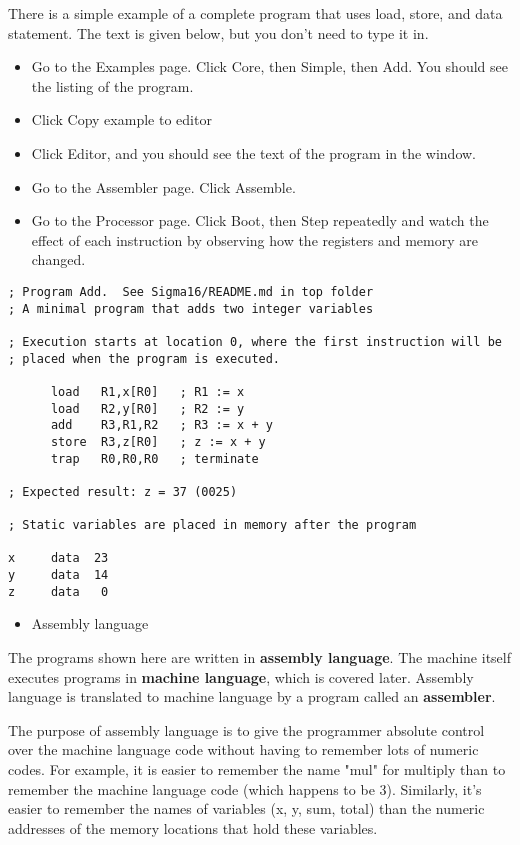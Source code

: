 \documentclass[11pt]{article}
\begin{document}
\begin{itemize}
There is a simple example of a complete program that uses load, store,
and data statement.  The text is given below, but you don't need to
type it in.

\begin{itemize}
\item Go to the Examples page.  Click Core, then Simple, then Add.  You
should see the listing of the program.
\item Click Copy example to editor
\item Click Editor, and you should see the text of the program in the
window.
\item Go to the Assembler page.  Click Assemble.
\item Go to the Processor page.  Click Boot, then Step repeatedly and
watch the effect of each instruction by observing how the registers
and memory are changed.
\end{itemize}

\begin{verbatim}
; Program Add.  See Sigma16/README.md in top folder
; A minimal program that adds two integer variables

; Execution starts at location 0, where the first instruction will be
; placed when the program is executed.

      load   R1,x[R0]   ; R1 := x
      load   R2,y[R0]   ; R2 := y
      add    R3,R1,R2   ; R3 := x + y
      store  R3,z[R0]   ; z := x + y
      trap   R0,R0,R0   ; terminate

; Expected result: z = 37 (0025)

; Static variables are placed in memory after the program

x     data  23
y     data  14
z     data   0
\end{verbatim}

\begin{itemize}
\item Assembly language
\end{itemize}

The programs shown here are written in \textbf{assembly language}.  The
machine itself executes programs in \textbf{machine language}, which is
covered later.  Assembly language is translated to machine language by
a program called an \textbf{assembler}.

The purpose of assembly language is to give the programmer absolute
control over the machine language code without having to remember lots
of numeric codes.  For example, it is easier to remember the name
"mul" for multiply than to remember the machine language code (which
happens to be 3).  Similarly, it's easier to remember the names of
variables (x, y, sum, total) than the numeric addresses of the memory
locations that hold these variables.


\end{itemize}
\end{document}
